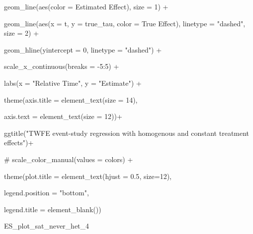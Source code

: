\documentclass[
  letterpaper,
  DIV=11,
  numbers=noendperiod]{scrartcl}
\newenvironment{Shaded}{\begin{snugshade}}{\end{snugshade}}
\newcommand{\AttributeTok}[1]{\textcolor[rgb]{0.40,0.45,0.13}{#1}}
\newcommand{\CommentTok}[1]{\textcolor[rgb]{0.37,0.37,0.37}{#1}}
\newcommand{\DecValTok}[1]{\textcolor[rgb]{0.68,0.00,0.00}{#1}}
\newcommand{\FloatTok}[1]{\textcolor[rgb]{0.68,0.00,0.00}{#1}}
\newcommand{\FunctionTok}[1]{\textcolor[rgb]{0.28,0.35,0.67}{#1}}
\newcommand{\NormalTok}[1]{\textcolor[rgb]{0.00,0.23,0.31}{#1}}
\newcommand{\SpecialCharTok}[1]{\textcolor[rgb]{0.37,0.37,0.37}{#1}}
\newcommand{\StringTok}[1]{\textcolor[rgb]{0.13,0.47,0.30}{#1}}
\begin{document}
\begin{Shaded}
\begin{Highlighting}[]
  \FunctionTok{geom\_line}\NormalTok{(}\FunctionTok{aes}\NormalTok{(}\AttributeTok{color =} \StringTok{\textquotesingle{}Estimated Effect\textquotesingle{}}\NormalTok{), }\AttributeTok{size =} \DecValTok{1}\NormalTok{) }\SpecialCharTok{+}

  \FunctionTok{geom\_line}\NormalTok{(}\FunctionTok{aes}\NormalTok{(}\AttributeTok{x =}\NormalTok{ t, }\AttributeTok{y =}\NormalTok{ true\_tau, }\AttributeTok{color =} \StringTok{\textquotesingle{}True Effect\textquotesingle{}}\NormalTok{), }\AttributeTok{linetype =} \StringTok{"dashed"}\NormalTok{, }\AttributeTok{size =} \DecValTok{2}\NormalTok{) }\SpecialCharTok{+}

  \FunctionTok{geom\_hline}\NormalTok{(}\AttributeTok{yintercept =} \DecValTok{0}\NormalTok{, }\AttributeTok{linetype =} \StringTok{"dashed"}\NormalTok{) }\SpecialCharTok{+}

  \FunctionTok{scale\_x\_continuous}\NormalTok{(}\AttributeTok{breaks =} \SpecialCharTok{{-}}\DecValTok{5}\SpecialCharTok{:}\DecValTok{5}\NormalTok{) }\SpecialCharTok{+}

  \FunctionTok{labs}\NormalTok{(}\AttributeTok{x =} \StringTok{"Relative Time"}\NormalTok{, }\AttributeTok{y =} \StringTok{"Estimate"}\NormalTok{) }\SpecialCharTok{+}

  \FunctionTok{theme}\NormalTok{(}\AttributeTok{axis.title =} \FunctionTok{element\_text}\NormalTok{(}\AttributeTok{size =} \DecValTok{14}\NormalTok{),}

        \AttributeTok{axis.text =} \FunctionTok{element\_text}\NormalTok{(}\AttributeTok{size =} \DecValTok{12}\NormalTok{))}\SpecialCharTok{+}

  \FunctionTok{ggtitle}\NormalTok{(}\StringTok{"TWFE event{-}study regression with homogenous and constant treatment effects"}\NormalTok{)}\SpecialCharTok{+}

  \CommentTok{\# scale\_color\_manual(values = colors) +}

  \FunctionTok{theme}\NormalTok{(}\AttributeTok{plot.title =} \FunctionTok{element\_text}\NormalTok{(}\AttributeTok{hjust =} \FloatTok{0.5}\NormalTok{, }\AttributeTok{size=}\DecValTok{12}\NormalTok{),}

        \AttributeTok{legend.position =} \StringTok{"bottom"}\NormalTok{,}

        \AttributeTok{legend.title =} \FunctionTok{element\_blank}\NormalTok{())}

 

\NormalTok{ES\_plot\_sat\_never\_het\_4}
\end{Highlighting}
\end{Shaded}
\end{document}
